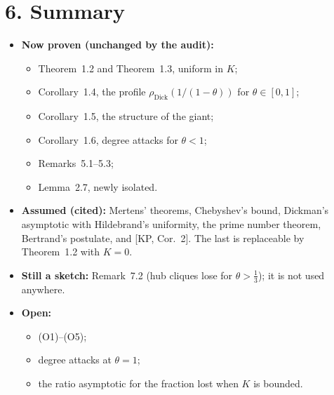 \documentclass[10pt]{article}
\newcommand{\dick}{\rho_{\mathrm{Dick}}}
\begin{document}
\section*{6. Summary}
\begin{itemize}\itemsep1pt
\item \textbf{Now proven (unchanged by the audit):}
  \begin{itemize}\itemsep0pt
  \item Theorem~1.2 and Theorem~1.3, uniform in $K$;
  \item Corollary~1.4, the profile $\dick(1/(1-\theta))$ for $\theta\in[0,1]$;
  \item Corollary~1.5, the structure of the giant;
  \item Corollary~1.6, degree attacks for $\theta<1$;
  \item Remarks~5.1--5.3;
  \item Lemma~2.7, newly isolated.
  \end{itemize}
\item \textbf{Assumed (cited):} Mertens' theorems, Chebyshev's bound, Dickman's asymptotic with Hildebrand's uniformity, the prime number theorem, Bertrand's postulate, and [KP, Cor.~2]. The last is replaceable by Theorem~1.2 with $K=0$.
\item \textbf{Still a sketch:} Remark~7.2 (hub cliques lose for $\theta>\frac13$); it is not used anywhere.
\item \textbf{Open:}
  \begin{itemize}\itemsep0pt
  \item (O1)--(O5);
  \item degree attacks at $\theta=1$;
  \item the ratio asymptotic for the fraction lost when $K$ is bounded.
  \end{itemize}
\end{itemize}
\end{document}
